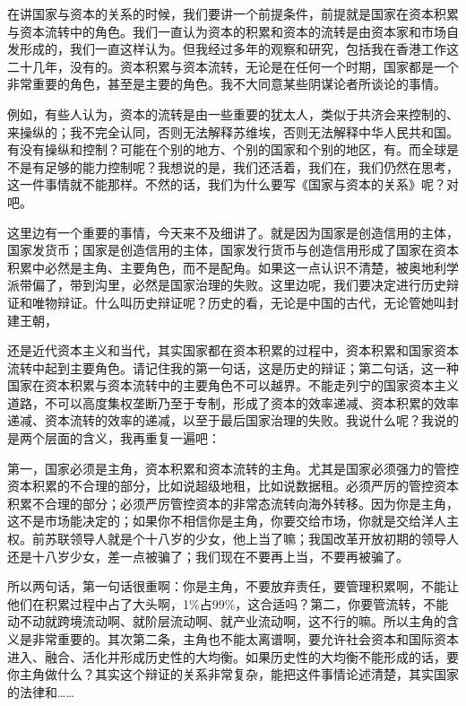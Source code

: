 \documentclass[UTF8, 12pt, a4paper]{ctexrep}
\begin{document}
在讲国家与资本的关系的时候，我们要讲一个前提条件，前提就是国家在资本积累与资本流转中的角色。我们一直认为资本的积累和资本的流转是由资本家和市场自发形成的，我们一直这样认为。但我经过多年的观察和研究，包括我在香港工作这二十几年，没有的。资本积累与资本流转，无论是在任何一个时期，国家都是一个非常重要的角色，甚至是主要的角色。我不大同意某些阴谋论者所谈论的事情。

例如，有些人认为，资本的流转是由一些重要的犹太人，类似于共济会来控制的、来操纵的；我不完全认同，否则无法解释苏维埃，否则无法解释中华人民共和国。有没有操纵和控制？可能在个别的地方、个别的国家和个别的地区，有。而全球是不是有足够的能力控制呢？我想说的是，我们还活着，我们在，我们仍然在思考，这一件事情就不能那样。不然的话，我们为什么要写《国家与资本的关系》呢？对吧。

这里边有一个重要的事情，今天来不及细讲了。就是因为国家是创造信用的主体，国家发货币；国家是创造信用的主体，国家发行货币与创造信用形成了国家在资本积累中必然是主角、主要角色，而不是配角。如果这一点认识不清楚，被奥地利学派带偏了，带到沟里，必然是国家治理的失败。这里边呢，我们要决定进行历史辩证和唯物辩证。什么叫历史辩证呢？历史的看，无论是中国的古代，无论管她叫封建王朝，

还是近代资本主义和当代，其实国家都在资本积累的过程中，资本积累和国家资本流转中起到主要角色。请记住我的第一句话，这是历史的辩证；第二句话，这一种国家在资本积累与资本流转中的主要角色不可以越界。不能走列宁的国家资本主义道路，不可以高度集权垄断乃至于专制，形成了资本的效率递减、资本积累的效率递减、资本流转的效率的递减，以至于最后国家治理的失败。我说什么呢？我说的是两个层面的含义，我再重复一遍吧：

第一，国家必须是主角，资本积累和资本流转的主角。尤其是国家必须强力的管控资本积累的不合理的部分，比如说超级地租，比如说数据租。必须严厉的管控资本积累不合理的部分；必须严厉管控资本的非常态流转向海外转移。因为你是主角，这不是市场能决定的；如果你不相信你是主角，你要交给市场，你就是交给洋人主权。前苏联领导人就是个十八岁的少女，他上当了嘛；我国改革开放初期的领导人还是十八岁少女，差一点被骗了；我们现在不要再上当，不要再被骗了。

所以两句话，第一句话很重啊：你是主角，不要放弃责任，要管理积累啊，不能让他们在积累过程中占了大头啊，1\%占99\%，这合适吗？第二，你要管流转，不能动不动就跨境流动啊、就阶层流动啊、就产业流动啊，这不行的嘛。所以主角的含义是非常重要的。其次第二条，主角也不能太离谱啊，要允许社会资本和国际资本进入、融合、活化并形成历史性的大均衡。如果历史性的大均衡不能形成的话，要你主角做什么？其实这个辩证的关系非常复杂，能把这件事情论述清楚，其实国家的法律和……
\end{document}
